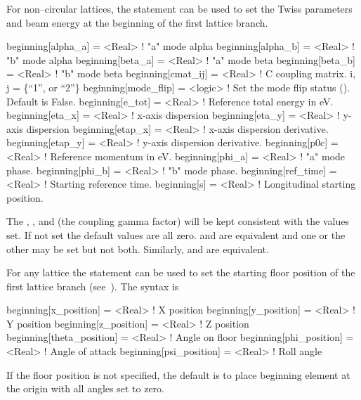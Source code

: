 For non--circular lattices, the  statement can be used to set the Twiss parameters and
beam energy at the beginning of the first lattice branch.
\begin{example}
  beginning[alpha_a]   = <Real>  ! "a" mode alpha
  beginning[alpha_b]   = <Real>  ! "b" mode alpha
  beginning[beta_a]    = <Real>  ! "a" mode beta
  beginning[beta_b]    = <Real>  ! "b" mode beta
  beginning[cmat_ij]   = <Real>  ! C coupling matrix. i, j = \{``1'', or ``2''\} 
  beginning[mode_flip] = <logic> ! Set the mode flip status (). Default is False.
  beginning[e_tot]     = <Real>  ! Reference total energy in eV.
  beginning[eta_x]     = <Real>  ! x-axis dispersion
  beginning[eta_y]     = <Real>  ! y-axis dispersion
  beginning[etap_x]    = <Real>  ! x-axis dispersion derivative.
  beginning[etap_y]    = <Real>  ! y-axis dispersion derivative.
  beginning[p0c]       = <Real>  ! Reference momentum in eV.
  beginning[phi_a]     = <Real>  ! "a" mode phase.
  beginning[phi_b]     = <Real>  ! "b" mode phase.
  beginning[ref_time]  = <Real>  ! Starting reference time.
  beginning[s]         = <Real>  ! Longitudinal starting position.
\end{example}
The , , and  (the coupling gamma factor) will be kept consistent
with the values set. If not set the default values are all zero.   and
 are equivalent and one or the other may be set but not both. Similarly,
 and  are equivalent.

For any lattice the  statement can be used to set the starting floor position of the
first lattice branch (see~). The syntax is
\begin{example}
  beginning[x_position]     = <Real>  ! X position
  beginning[y_position]     = <Real>  ! Y position
  beginning[z_position]     = <Real>  ! Z position
  beginning[theta_position] = <Real>  ! Angle on floor
  beginning[phi_position]   = <Real>  ! Angle of attack
  beginning[psi_position]   = <Real>  ! Roll angle
\end{example}
If the floor position is not specified, the default is to place
beginning element at the origin with all angles set to zero.

